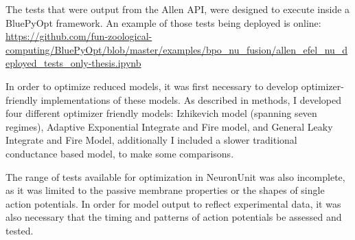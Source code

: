 



The tests that were output from the Allen API, were designed to execute inside a BluePyOpt framework. An example of those tests being deployed is online: \url{https://github.com/fun-zoological-computing/BluePyOpt/blob/master/examples/bpo_nu_fusion/allen_efel_nu_deployed_tests_only-thesis.ipynb}


In order to optimize reduced models, it was first necessary to develop optimizer-friendly implementations of these models. As described in methods, I developed four different optimizer friendly models: Izhikevich model (spanning seven regimes), Adaptive Exponential Integrate and Fire model, and General Leaky Integrate and Fire Model, additionally I included a slower traditional conductance based model, to make some comparisons.

The range of tests available for optimization in NeuronUnit was also incomplete, as it was limited to the passive membrane properties or the shapes of single action potentials.  In order for model output to reflect experimental data, it was also necessary that the timing and patterns of action potentials be assessed and tested. 

